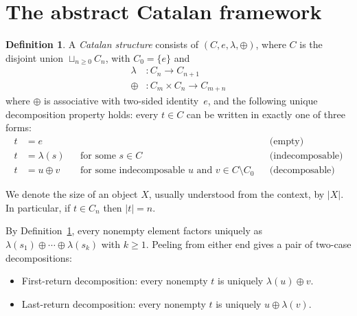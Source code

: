 \documentclass[a4paper,11pt]{article}
\theoremstyle{definition}
\newtheorem{definition}[theorem]{Definition}
\begin{document}
\section{The abstract Catalan framework}\label{sec:framework}

\begin{definition}\label{def:catalan-structure}
A \emph{Catalan structure} consists of $(C,e,\lambda,\oplus)$,
where $C$ is the disjoint union $\sqcup_{n\geq 0}C_n$, with $C_0=\{e\}$ and
\begin{align*}
  \lambda & \colon C_n\to C_{n+1}\\
  \oplus & \colon C_m\times C_n\to C_{m+n}
\end{align*}
where $\oplus$ is associative with two-sided identity~$e$, and the following
unique decomposition property holds: every $t\in C$ can be written in exactly
one of three forms:
\begin{align*}
  t &= e && && \text{(empty)}\\
  t &= \lambda(s)
    &&\text{for some $s\in C$}
    && \text{(indecomposable)} \\
  t &= u\oplus v
    &&\text{for some indecomposable $u$ and $v\in C\setminus C_0$}
    && \text{(decomposable)}
\end{align*}
\end{definition}

We denote the size of an object $X$, usually understood from the context, by
$|X|$.  In particular, if $t\in C_n$ then $|t|=n$.

By Definition~\ref{def:catalan-structure}, every
nonempty element factors uniquely as
$\lambda(s_1) \oplus \cdots \oplus \lambda(s_k)$ with $k \ge 1$. Peeling from
either end gives a pair of two-case decompositions:
\begin{itemize}
\item First-return decomposition: every nonempty $t$ is
  uniquely $\lambda(u) \oplus v$.
\item Last-return decomposition: every nonempty $t$ is
  uniquely $u \oplus \lambda(v)$.
\end{itemize}
\end{document}
